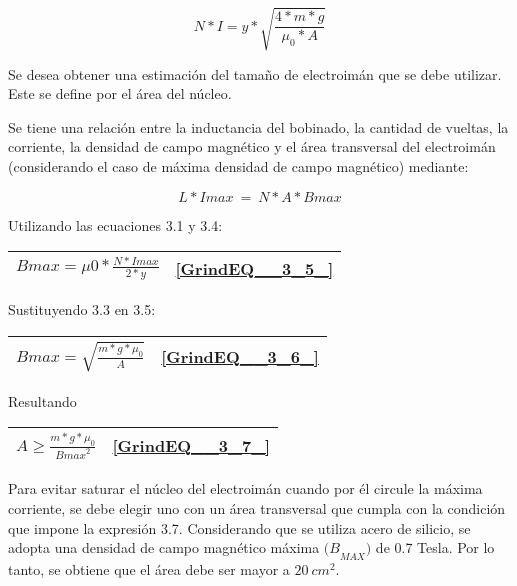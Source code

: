 \documentclass{article} %
\begin{document}
\noindent 
\begin{equation} \label{GrindEQ__3_3_} 
N*I=y*\sqrt{\frac{4*m*g}{{\mu }_0*A}} 
\end{equation} 


\noindent Se desea obtener una estimaci\'{o}n del tama\~{n}o de electroim\'{a}n que se debe utilizar. Este se define por el \'{a}rea del n\'{u}cleo.

\noindent 

\noindent Se tiene una relaci\'{o}n entre la inductancia del bobinado, la cantidad de vueltas, la corriente, la densidad de campo magn\'{e}tico y el \'{a}rea transversal del electroim\'{a}n (considerando el caso de m\'{a}xima densidad de campo magn\'{e}tico) mediante:

\noindent 
\begin{equation} \label{GrindEQ__3_4_} 
L*Imax\ =\ N*A*Bmax 
\end{equation} 


\noindent Utilizando las ecuaciones 3.1 y 3.4:

\noindent 

\begin{tabular}{|p{3.9in}|p{0.4in}|} \hline 
$Bmax=\mu 0*\frac{N*Imax}{2*y}$ & \eqref{GrindEQ__3_5_}  \\ \hline 
\end{tabular}



\noindent Sustituyendo 3.3 en 3.5:

\noindent 

\begin{tabular}{|p{3.9in}|p{0.4in}|} \hline 
$Bmax=\sqrt{\frac{m*g*{\mu }_0}{A}}$ & \eqref{GrindEQ__3_6_}  \\ \hline 
\end{tabular}

Resultando

\begin{tabular}{|p{3.9in}|p{0.4in}|} \hline 
$A\ge \frac{m*g*{\mu }_0}{{Bmax}^2}$ & \eqref{GrindEQ__3_7_}  \\ \hline 
\end{tabular}

Para evitar saturar el n\'{u}cleo del electroim\'{a}n cuando  por \'{e}l circule la m\'{a}xima corriente, se debe elegir uno con un \'{a}rea transversal que cumpla con la condici\'{o}n que impone la expresi\'{o}n  3.7. Considerando que se utiliza acero de silicio, se adopta una densidad de campo magn\'{e}tico m\'{a}xima  ${(B}_{MAX})$ de 0.7 Tesla. Por lo tanto, se obtiene que el \'{a}rea debe ser mayor a $20\ {cm}^2$.\textbf{}
\end{document}
